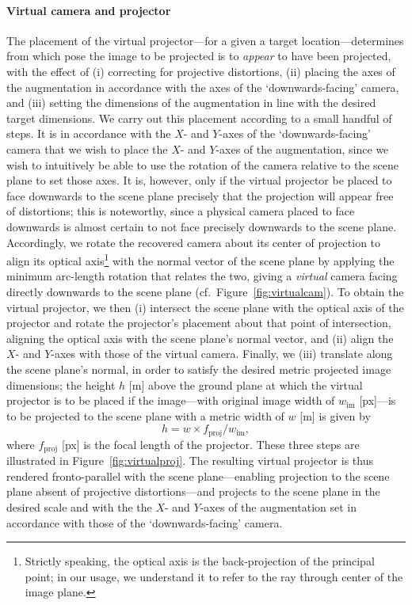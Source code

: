 \documentclass[review]{elsarticle}
\begin{document}
\paragraph{Virtual camera and projector} The placement of the virtual projector---for a given a target location---determines from which pose the image to be projected is to \textit{appear} to have been projected, with the effect of (i) correcting for projective distortions, (ii) placing the axes of the augmentation in accordance with the axes of the `downwards-facing' camera, and (iii) setting the dimensions of the augmentation in line with the desired target dimensions.  We carry out this placement according to a small handful of steps. It is in accordance with the $X$- and $Y$-axes of the `downwards-facing' camera that we wish to place the $X$- and $Y$-axes of the augmentation, since we wish to intuitively be able to use the rotation of the camera relative to the scene plane to set those axes. It is, however, only if the virtual projector be placed to face downwards to the scene plane precisely that the projection will appear free of distortions; this is noteworthy, since a physical camera placed to face downwards is almost certain to not face precisely downwards to the scene plane. Accordingly, we rotate the recovered camera about its center of projection to align its optical axis\footnote{Strictly speaking, the optical axis is the back-projection of the principal point; in our usage, we understand it to refer to the ray through center of the image plane.} with the normal vector of the scene plane by applying the minimum arc-length rotation that relates the two, giving a \textit{virtual} camera facing directly downwards to the scene plane (cf.\ Figure~\ref{fig:virtualcam}). To obtain the virtual projector, we then (i) intersect the scene plane with the optical axis of the projector and rotate the projector's placement about that point of intersection, aligning the optical axis with the scene plane's normal vector, and (ii) align the $X$- and $Y$-axes with those of the virtual camera. Finally, we (iii) translate along the scene plane's normal, in order to satisfy the desired metric projected image dimensions; the height $h$ [m] above the ground plane at which the virtual projector is to be placed if the image---with original image width of $w_\text{im}$ [px]---is to be projected to the scene plane with a metric width of $w$ [m] is given by
\begin{equation}
h = w \times f_\text{proj} / w_\text{im},
\end{equation}
where $f_\text{proj}$ [px] is the focal length of the projector. These three steps are illustrated in Figure~\ref{fig:virtualproj}. The resulting virtual projector is thus rendered fronto-parallel with the scene plane---enabling projection to the scene plane absent of projective distortions---and projects to the scene plane in the desired scale and with the the $X$- and $Y$-axes of the augmentation set in accordance with those of the `downwards-facing' camera. %
\end{document}
